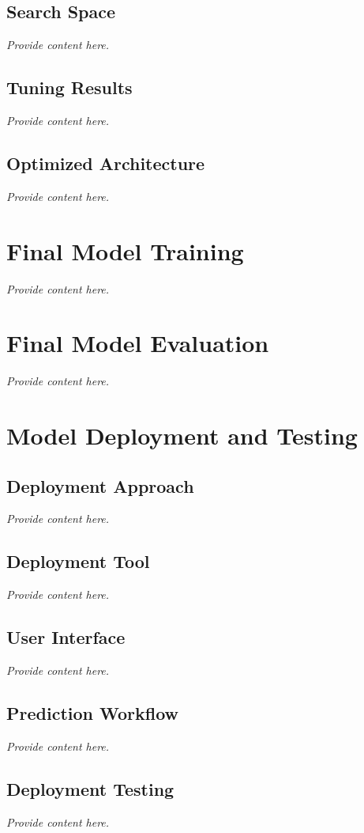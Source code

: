 \documentclass[12pt, a4paper]{article}
\begin{document}
\subsection{Search Space}
\textit{Provide content here.}

\subsection{Tuning Results}
\textit{Provide content here.}

\subsection{Optimized Architecture}
\textit{Provide content here.}

\section{Final Model Training}
\textit{Provide content here.}

\section{Final Model Evaluation}
\textit{Provide content here.}

\section{Model Deployment and Testing}
\subsection{Deployment Approach}
\textit{Provide content here.}

\subsection{Deployment Tool}
\textit{Provide content here.}

\subsection{User Interface}
\textit{Provide content here.}

\subsection{Prediction Workflow}
\textit{Provide content here.}

\subsection{Deployment Testing}
\textit{Provide content here.}
\end{document}
